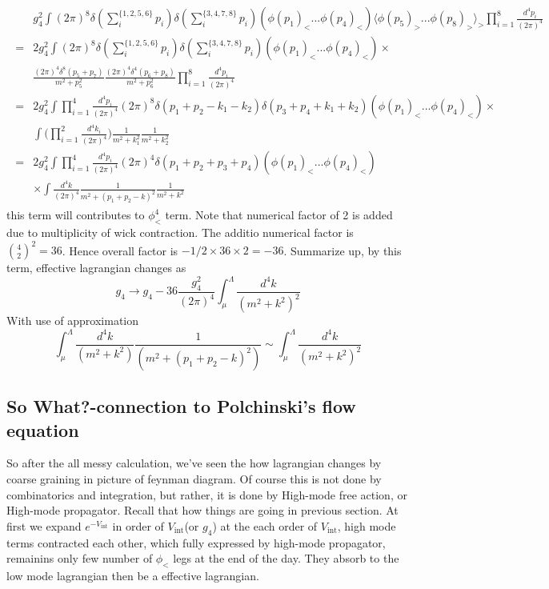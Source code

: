 \documentclass[12pt,halfline,a4paper]{ouparticle}
\begin{document}
\begin{align}
	\begin{split}
		&g_4^2\int(2\pi)^8\delta(\sum_i^{\{1,2,5,6\}}p_i)\delta(\sum_i^{\{3,4,7,8\}}p_i)(\phi(p_1)_<...\phi(p_4)_<)\langle\phi(p_5)_>...\phi(p_8)_>\rangle_>\prod_{i=1}^8\frac{d^4p_i}{(2\pi)^4}\\
		=&2g_4^2\int(2\pi)^8\delta(\sum_i^{\{1,2,5,6\}}p_i)\delta(\sum_i^{\{3,4,7,8\}}p_i)(\phi(p_1)_<...\phi(p_4)_<)\times\\
		&\frac{(2\pi)^4\delta^8(p_5+p_7)}{m^2+p_5^2}\frac{(2\pi)^4\delta^4(p_6+p_8)}{m^2+p_6^2}\prod_{i=1}^8\frac{d^4p_i}{(2\pi)^4}\\
		=&2g_4^2\int\prod_{i=1}^4\frac{d^4p_i}{(2\pi)^4}(2\pi)^8\delta(p_1+p_2-k_1-k_2)\delta(p_3+p_4+k_1+k_2)(\phi(p_1)_<...\phi(p_4)_<)\times\\
		&\int\bigg(\prod_{i=1}^2\frac{d^4k_i}{(2\pi)^4}\bigg)\frac{1}{m^2+k_1^2}\frac{1}{m^2+k_2^2}\\
		=&2g_4^2\int\prod_{i=1}^4\frac{d^4p_i}{(2\pi)^4}(2\pi)^4\delta(p_1+p_2+p_3+p_4)(\phi(p_1)_<...\phi(p_4)_<)
		\\&\times\int\frac{d^4k}{(2\pi)^4}\frac{1}{m^2+(p_1+p_2-k)^2}\frac{1}{m^2+k^2}
	\end{split}
\end{align}
this term will contributes to $\phi_<^4$ term. Note that numerical factor of 2 is added due to multiplicity of wick contraction. The additio numerical factor is ${4\choose 2}^ 2=36$.
Hence overall factor is $-1/2\times 36 \times 2= -36$. Summarize up, by this term, effective lagrangian changes as
\begin{equation}
	g_4\rightarrow g_4-36\frac{g_4^2}{(2\pi)^4}\int^\Lambda_\mu\frac{d^4k}{(m^2+k^2)^2}
\end{equation}
With use of approximation
\begin{equation}
	\int^\Lambda_\mu\frac{d^4k}{(m^2+k^2)}\frac{1}{(m^2+(p_1+p_2-k)^2)}\sim \int^\Lambda_\mu\frac{d^4k}{(m^2+k^2)^2}
\end{equation}
\subsection{So What?-connection to Polchinski's flow equation}
So after the all messy calculation, we've seen the how lagrangian changes by coarse graining in picture of feynman diagram.
Of course this is not done by combinatorics and integration, but rather, it is done by High-mode free action, or High-mode propagator.
Recall that how things are going in previous section. At first we expand $e^{-V_\text{int}}$ in order of $V_\text{int}$(or $g_4$) at the each order of $V_\text{int}$, high mode terms contracted each other, which fully expressed by high-mode propagator,
remainins only few number of $\phi_<$ legs at the end of the day. They absorb to the low mode lagrangian then be a effective lagrangian.
\end{document}

